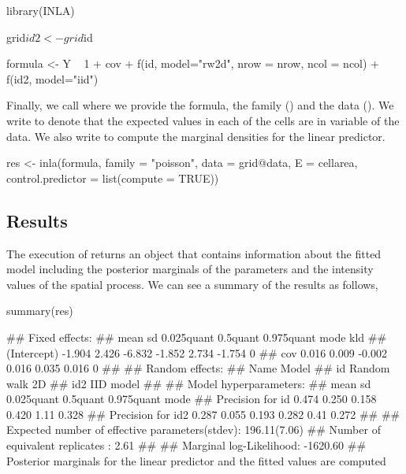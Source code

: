 \begin{example}
library(INLA)

grid$id2 <- grid$id

formula <- Y ~ 1 + cov +
  f(id, model="rw2d", nrow = nrow, ncol = ncol) +
  f(id2, model="iid")
\end{example}

Finally, we call  where we provide the formula, the family () and the data (). We write  to denote that the expected values in each of the cells are in variable  of the data.
We also write  to compute the marginal densities for the linear predictor.



\begin{example}
res <- inla(formula, family = "poisson", data = grid@data,
            E = cellarea, control.predictor = list(compute = TRUE))
\end{example}


\subsection{Results}

The execution of  returns an object  that contains information about the fitted model including the posterior marginals of the parameters and the intensity values of the spatial process.
We can see a summary of the results as follows,

\begin{example}
summary(res)

## Fixed effects:
##               mean    sd 0.025quant 0.5quant 0.975quant   mode kld
## (Intercept) -1.904 2.426     -6.832   -1.852      2.734 -1.754   0
## cov          0.016 0.009     -0.002    0.016      0.035  0.016   0
## 
## Random effects:
##   Name	  Model
##     id Random walk 2D
##    id2 IID model
## 
## Model hyperparameters:
##                    mean    sd 0.025quant 0.5quant 0.975quant  mode
## Precision for id  0.474 0.250      0.158    0.420       1.11 0.328
## Precision for id2 0.287 0.055      0.193    0.282       0.41 0.272
## 
## Expected number of effective parameters(stdev): 196.11(7.06)
## Number of equivalent replicates : 2.61 
## 
## Marginal log-Likelihood:  -1620.60 
## Posterior marginals for the linear predictor and the fitted values are computed
\end{example}


